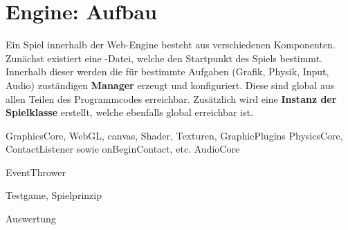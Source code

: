 \part{Engine: Aufbau}

Ein Spiel innerhalb der Web-Engine besteht aus verschiedenen Komponenten. Zunächst existiert eine -Datei, welche den Startpunkt des Spiels bestimmt. Innerhalb dieser werden die für bestimmte Aufgaben (Grafik, Physik, Input, Audio) zuständigen \textbf{Manager} erzeugt und konfiguriert. Diese sind global aus allen Teilen des Programmcodes erreichbar. Zusätzlich wird eine \textbf{Instanz der Spielklasse} erstellt, welche ebenfalls global erreichbar ist.









GraphicsCore, WebGL, canvas, Shader, Texturen, GraphicPlugins
PhysicsCore, ContactListener sowie onBeginContact, etc.
AudioCore

EventThrower

Testgame, Spielprinzip

Auswertung